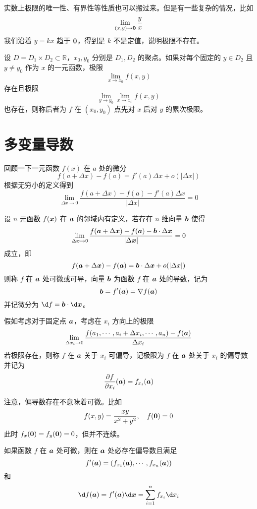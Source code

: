 实数上极限的唯一性、有界性等性质也可以搬过来。但是有一些复杂的情况，比如
\[ \lim_{(x, y) \to \boldsymbol{0}} \frac{y}{x} \]
我们沿着 $y = kx$ 趋于 $\boldsymbol{0}$，得到是 $k$ 不是定值，说明极限不存在。

\begin{definition}
	设 $D = D_1 \times D_2 \subset \mathbb{R}$，$x_0, y_0$ 分别是 $D_1, D_2$ 的聚点。如果对每个固定的 $y \in D_2$ 且 $y \neq y_0$ 作为 $x$ 的一元函数，极限
	\[ \lim_{x \to x_0} f(x, y) \]
	存在且极限
	\[ \lim_{y \to y_0} \lim_{x \to x_0} f(x, y) \]
	也存在，则称后者为 $f$ 在 $(x_0, y_0)$ 点先对 $x$ 后对 $y$ 的累次极限。
\end{definition}

\section{多变量导数}

回顾一下一元函数 $f(x)$ 在 $a$ 处的微分
\[ f(a + \Delta x) - f(a) = f'(a) \Delta x + o(|\Delta x|) \]
根据无穷小的定义得到
\[ \lim_{\Delta x \to 0} \frac{f(a + \Delta x) - f(a) - f'(a) \Delta x}{|\Delta x|} = 0 \]

\begin{definition}
	设 $n$ 元函数 $f(\boldsymbol{x})$ 在 $\boldsymbol{a}$ 的邻域内有定义，若存在 $n$ 维向量 $\boldsymbol{b}$ 使得
	\[ \lim_{\Delta \boldsymbol{x} \to 0} \frac{f(\boldsymbol{a} + \Delta \boldsymbol{x}) - f(\boldsymbol{a}) - \boldsymbol{b} \cdot \Delta \boldsymbol{x}}{|\Delta \boldsymbol{x}|} = 0 \]
	成立，即
	\[ f(\boldsymbol{a} + \Delta \boldsymbol{x}) - f(\boldsymbol{a}) = \boldsymbol{b} \cdot \Delta \boldsymbol{x} + o(|\Delta x|) \]
	则称 $f$ 在 $\boldsymbol{a}$ 处可微或可导，向量 $\boldsymbol{b}$ 为函数 $f$ 在 $\boldsymbol{a}$ 处的导数，记为
	\[ \boldsymbol{b} = f'(\boldsymbol{a}) = \nabla f(\boldsymbol{a}) \]
	并记微分为 $\d f = \vbf{b} \cdot \d \vbf{x}$。
\end{definition}

假如考虑对于固定点 $\boldsymbol{a}$，考虑在 $x_i$ 方向上的极限
\[ \lim_{\Delta x_i \to 0} \frac{f(a_1, \cdots, a_i + \Delta x_i, \cdots, a_n) - f(\boldsymbol{a})}{\Delta x_i} \]
若极限存在，则称 $f$ 在 $\boldsymbol{a}$ 关于 $x_i$ 可偏导，记极限为 $f$ 在 $\boldsymbol{a}$ 处关于 $x_i$ 的偏导数并记为
\[ \frac{\partial f}{\partial x_i}(\boldsymbol{a}) = f_{x_i}(\boldsymbol{a}) \]

注意，偏导数存在不意味着可微。比如
\[ f(x, y) = \frac{xy}{x^2 + y^2}, \quad f(\boldsymbol{0}) = 0 \]
此时 $f_x(\boldsymbol{0}) = f_y(\boldsymbol{0}) = 0$，但并不连续。

\begin{theorem}
	如果函数 $f$ 在 $\boldsymbol{a}$ 处可微，则在 $\boldsymbol{a}$ 处必存在偏导数且满足
	\[ f'(\boldsymbol{a}) = \left( f_{x_1}(\boldsymbol{a}), \cdots, f_{x_n}(\boldsymbol{a}) \right) \]
	和
	\[ \d f(\vbf{a}) = f'(\vbf{a}) \d \vbf{x} = \sum_{i=1}^n f_{x_i} \d x_i \]
\end{theorem}

